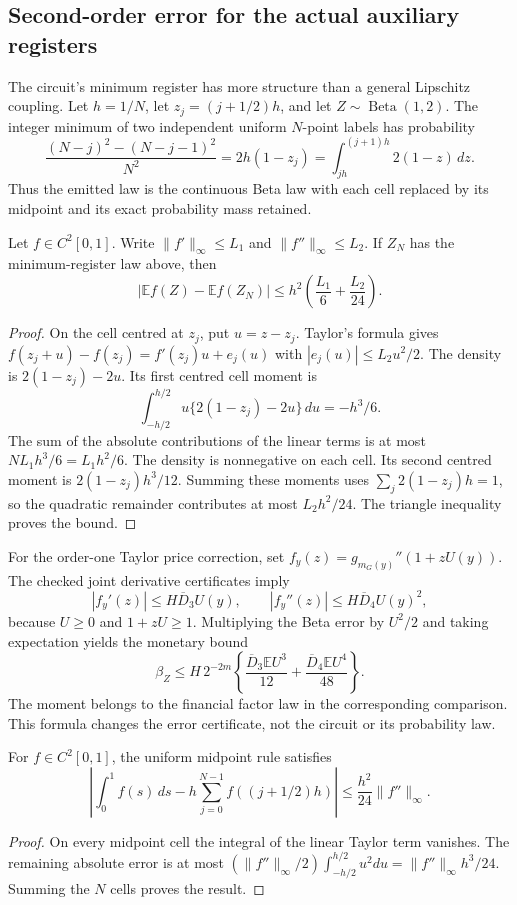 \subsection{Second-order error for the actual auxiliary registers}

The circuit's minimum register has more structure than a general
Lipschitz coupling. Let $h=1/N$, let $z_j=(j+1/2)h$, and let
$Z\sim\operatorname{Beta}(1,2)$. The integer minimum of two independent
uniform $N$-point labels has probability
\[
 \frac{(N-j)^2-(N-j-1)^2}{N^2}
 =2h(1-z_j)=\int_{jh}^{(j+1)h}2(1-z)\,dz.
\]
Thus the emitted law is the continuous Beta law with each cell replaced
by its midpoint and its exact probability mass retained.

\begin{proposition}
Let $f\in C^2[0,1]$. Write $\|f'\|_\infty\leq L_1$ and
$\|f''\|_\infty\leq L_2$. If $Z_N$ has the minimum-register law above,
then
\[
 |\mathbb E f(Z)-\mathbb E f(Z_N)|
 \leq h^2\left(\frac{L_1}{6}+\frac{L_2}{24}\right).
\]
\end{proposition}
\begin{proof}
On the cell centred at $z_j$, put $u=z-z_j$. Taylor's formula gives
$f(z_j+u)-f(z_j)=f'(z_j)u+e_j(u)$ with
$|e_j(u)|\leq L_2u^2/2$. The density is
$2(1-z_j)-2u$. Its first centred cell moment is
\[
 \int_{-h/2}^{h/2}u\{2(1-z_j)-2u\}\,du=-h^3/6.
\]
The sum of the absolute contributions of the linear terms is at most
$NL_1h^3/6=L_1h^2/6$. The density is nonnegative on each cell.
Its second centred moment is
$2(1-z_j)h^3/12$. Summing these moments uses
$\sum_j2(1-z_j)h=1$, so the quadratic remainder contributes at most
$L_2h^2/24$. The triangle inequality proves the bound.
\end{proof}

For the order-one Taylor price correction, set
$f_y(z)=g_{m_G(y)}''(1+zU(y))$. The checked joint derivative
certificates imply
\[
 |f_y'(z)|\leq H\overline D_3U(y),\qquad
 |f_y''(z)|\leq H\overline D_4U(y)^2,
\]
because $U\geq0$ and $1+zU\geq1$. Multiplying the Beta error by
$U^2/2$ and taking expectation yields the monetary bound
\[
 \beta_Z\leq H\,2^{-2m}
 \left\{\frac{\overline D_3\mathbb E U^3}{12}
       +\frac{\overline D_4\mathbb E U^4}{48}\right\}.
\]
The moment belongs to the financial factor law in the corresponding
comparison. This formula changes the error certificate, not the circuit
or its probability law.

\begin{proposition}
For $f\in C^2[0,1]$, the uniform midpoint rule satisfies
\[
 \left|\int_0^1f(s)\,ds-h\sum_{j=0}^{N-1}f((j+1/2)h)\right|
 \leq\frac{h^2}{24}\|f''\|_\infty.
\]
\end{proposition}
\begin{proof}
On every midpoint cell the integral of the linear Taylor term vanishes.
The remaining absolute error is at most
$(\|f''\|_\infty/2)\int_{-h/2}^{h/2}u^2du
=\|f''\|_\infty h^3/24$. Summing the $N$ cells proves the result.
\end{proof}

